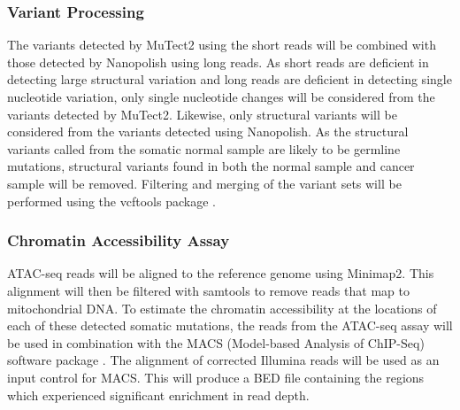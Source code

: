\subsubsection{Variant Processing}
The variants detected by MuTect2 using the short reads will be combined with those detected by Nanopolish using long reads. As short reads are deficient in detecting large structural variation and long reads are deficient in detecting single nucleotide variation, only single nucleotide changes will be considered from the variants detected by MuTect2. Likewise, only structural variants will be considered from the variants detected using Nanopolish.
As the structural variants called from the somatic normal sample are likely to be germline mutations, structural variants found in both the normal sample and cancer sample will be removed.
Filtering and merging of the variant sets will be performed using the vcftools package \parencite{danecek_variant_2011}.

\subsubsection{Chromatin Accessibility Assay}
ATAC-seq reads will be aligned to the reference genome using Minimap2.
This alignment will then be filtered with samtools \parencite{li_sequence_2009} to remove reads that map to mitochondrial DNA.
To estimate the chromatin accessibility at the locations of each of these detected somatic mutations, the reads from the ATAC-seq assay will be used in combination with the MACS (Model-based Analysis of ChIP-Seq) software package \parencite{zhang_model-based_2008}.
The alignment of corrected Illumina reads will be used as an input control for MACS.
This will produce a BED file containing the regions which experienced significant enrichment in read depth.


